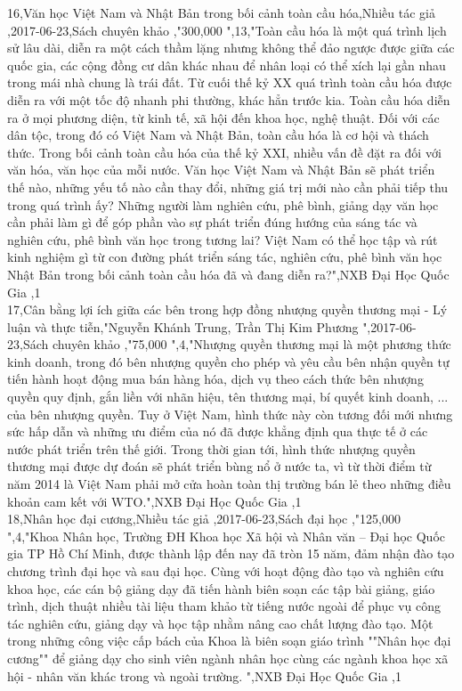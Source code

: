 \documentclass[a4paper]{article}
\begin{document}
16,Văn học Việt Nam và Nhật Bản trong bối cảnh toàn cầu hóa,Nhiều tác giả ,2017-06-23,Sách chuyên khảo ,"300,000 ",13,"Toàn cầu hóa là một quá trình lịch sử lâu dài, diễn ra một cách thầm lặng nhưng không thể đảo ngược được giữa các quốc gia, các cộng đồng cư dân khác nhau để nhân loại có thể xích lại gần nhau trong mái nhà chung là trái đất. Từ cuối thế kỷ XX quá trình toàn cầu hóa được diễn ra với một tốc độ nhanh phi thường, khác hẳn trước kia. Toàn cầu hóa diễn ra ở mọi phương diện, từ kinh tế, xã hội đến khoa học, nghệ thuật. Đối với các dân tộc, trong đó có Việt Nam và Nhật Bản, toàn cầu hóa là cơ hội và thách thức. Trong bối cảnh toàn cầu hóa của thế kỷ XXI, nhiều vấn đề đặt ra đối với văn hóa, văn học của mỗi nước. Văn học Việt Nam và Nhật Bản sẽ phát triển thế nào, những yếu tố nào cần thay đổi, những giá trị mới nào cần phải tiếp thu trong quá trình ấy? Những người làm nghiên cứu, phê bình, giảng dạy văn học cần phải làm gì để góp phần vào sự phát triển đúng hướng của sáng tác và nghiên cứu, phê bình văn học trong tương lai? Việt Nam có thể học tập và rút kinh nghiệm gì từ con đường phát triển sáng tác, nghiên cứu, phê bình văn học Nhật Bản trong bối cảnh toàn cầu hóa đã và đang diễn ra?",NXB Đại Học Quốc Gia ,1\\
17,Cân bằng lợi ích giữa các bên trong hợp đồng nhượng quyền thương mại - Lý luận và thực tiễn,"Nguyễn Khánh Trung, Trần Thị Kim Phương ",2017-06-23,Sách chuyên khảo ,"75,000 ",4,"Nhượng quyền thương mại là một phương thức kinh doanh, trong đó bên nhượng quyền cho phép và yêu cầu bên nhận quyền tự tiến hành hoạt động mua bán hàng hóa, dịch vụ theo cách thức bên nhượng quyền quy định, gắn liền với nhãn hiệu, tên thương mại, bí quyết kinh doanh, ... của bên nhượng quyền. Tuy ở Việt Nam, hình thức này còn tương đối mới nhưng sức hấp dẫn và những ưu điểm của nó đã được khẳng định qua thực tế ở các nước phát triển trên thế giới. Trong thời gian tới, hình thức nhượng quyền thương mại được dự đoán sẽ phát triển bùng nổ ở nước ta, vì từ thời điểm từ năm 2014 là Việt Nam phải mở cửa hoàn toàn thị trường bán lẻ theo những điều khoản cam kết với WTO.",NXB Đại Học Quốc Gia ,1\\
18,Nhân học đại cương,Nhiều tác giả ,2017-06-23,Sách đại học ,"125,000 ",4,"Khoa Nhân học, Trường ĐH Khoa học Xã hội và Nhân văn – Đại học Quốc gia TP Hồ Chí Minh, được thành lập đến nay đã tròn 15 năm, đảm nhận đào tạo chương trình đại học và sau đại học. Cùng với hoạt động đào tạo và nghiên cứu khoa học, các cán bộ giảng dạy đã tiến hành biên soạn các tập bài giảng, giáo trình, dịch thuật nhiều tài liệu tham khảo từ tiếng nước ngoài để phục vụ công tác nghiên cứu, giảng dạy và học tập nhằm nâng cao chất lượng đào tạo. Một trong những công việc cấp bách của Khoa là biên soạn giáo trình ""Nhân học đại cương"" để giảng dạy cho sinh viên ngành nhân học cùng các ngành khoa học xã hội - nhân văn khác trong và ngoài trường. ",NXB Đại Học Quốc Gia ,1\\
\end{document}
